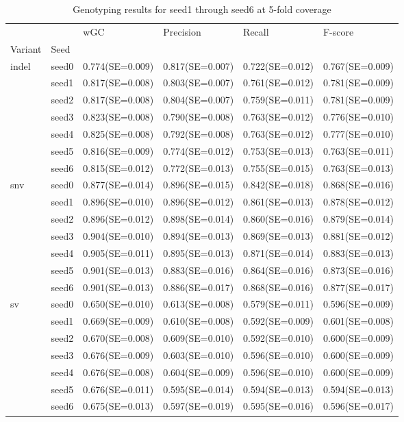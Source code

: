 \documentclass[PhD]{PHlab-thesis}
\begin{document}
\begin{table}[ht!]
\begin{tabular*}{\textwidth}{@{\extracolsep{\fill}}llllll@{\extracolsep{\fill}}}
\toprule
   &         &               wGC &         Precision &            Recall &           F-score \\
Variant & Seed &                   &                   &                   &                   \\
\midrule
indel & seed0  & 0.774(SE=0.009) & 0.817(SE=0.007) & 0.722(SE=0.012) & 0.767(SE=0.009) \\
   & seed1 & 0.817(SE=0.008)&  0.803(SE=0.007)&  0.761(SE=0.012)&  0.781(SE=0.009)\\
   & seed2 & 0.817(SE=0.008) & 0.804(SE=0.007) &0.759(SE=0.011) & 0.781(SE=0.009)\\
   & seed3 & 0.823(SE=0.008)& 0.790(SE=0.008)& 0.763(SE=0.012)& 0.776(SE=0.010)\\
   & seed4 & 0.825(SE=0.008) & 0.792(SE=0.008) & 0.763(SE=0.012)&  0.777(SE=0.010)\\
   & seed5 & 0.816(SE=0.009)&  0.774(SE=0.012)&  0.753(SE=0.013)&  0.763(SE=0.011)\\
   & seed6 & 0.815(SE=0.012)&  0.772(SE=0.013)&  0.755(SE=0.015)&  0.763(SE=0.013)\\
\midrule
snv & seed0  & 0.877(SE=0.014)  & 0.896(SE=0.015)  & 0.842(SE=0.018)  & 0.868(SE=0.016) \\
   & seed1 &0.896(SE=0.010)&  0.896(SE=0.012)&  0.861(SE=0.013)&  0.878(SE=0.012)\\
   & seed2 &0.896(SE=0.012)&0.898(SE=0.014)& 0.860(SE=0.016)& 0.879(SE=0.014)\\
   & seed3 & 0.904(SE=0.010)& 0.894(SE=0.013)& 0.869(SE=0.013)& 0.881(SE=0.012)\\
   & seed4 & 0.905(SE=0.011)&  0.895(SE=0.013)&  0.871(SE=0.014)&  0.883(SE=0.013)\\
   & seed5 & 0.901(SE=0.013)&  0.883(SE=0.016)&  0.864(SE=0.016)&  0.873(SE=0.016)\\
   & seed6 &  0.901(SE=0.013)&  0.886(SE=0.017)&  0.868(SE=0.016)&  0.877(SE=0.017) \\
\midrule
sv & seed0  & 0.650(SE=0.010) & 0.613(SE=0.008)  & 0.579(SE=0.011)  & 0.596(SE=0.009) \\
   & seed1 & 0.669(SE=0.009)&  0.610(SE=0.008)&  0.592(SE=0.009)&  0.601(SE=0.008)\\
   & seed2 & 0.670(SE=0.008) & 0.609(SE=0.010) & 0.592(SE=0.010) & 0.600(SE=0.009)\\
   & seed3 & 0.676(SE=0.009)&0.603(SE=0.010)&0.596(SE=0.010)&0.600(SE=0.009)\\
   & seed4 & 0.676(SE=0.008) & 0.604(SE=0.009)&  0.596(SE=0.010)&  0.600(SE=0.009)\\
   & seed5 & 0.676(SE=0.011)&  0.595(SE=0.014)&  0.594(SE=0.013)&  0.594(SE=0.013)\\
   & seed6 & 0.675(SE=0.013)&  0.597(SE=0.019)&  0.595(SE=0.016)&  0.596(SE=0.017)\\
\bottomrule
\end{tabular*}
\caption{Genotyping results for seed1 through seed6 at 5-fold coverage 
\label{table:5x-results}}
\end{table}
\end{document}
